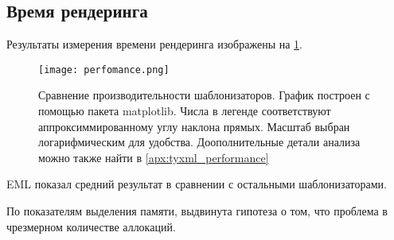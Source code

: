 \subsection{Время рендеринга}

Результаты измерения времени рендеринга изображены на \ref{fig:perfomance}.

\begin{figure}[h!]
    \texttt{[image: perfomance.png]}
    \caption{Сравнение производительности шаблонизаторов. График построен с помощью пакета matplotlib. Числа в легенде соответствуют аппроксиммированному углу наклона прямых. Масштаб выбран логарифмическим для удобства. Доополнительные детали анализа можно также найти в \ref{apx:tyxml_performance}}
    \label{fig:perfomance}
\end{figure}

EML показал средний результат в сравнении с остальными шаблонизаторами.

По показателям выделения памяти, выдвинута гипотеза о том, что проблема в чрезмерном количестве аллокаций.


